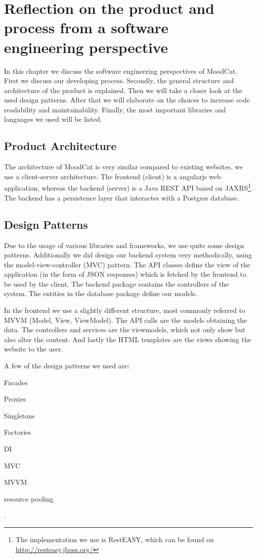 \chapter{Reflection on the product and process from a software engineering perspective}
In this chapter we discuss the software engineering perspectives of MoodCat.
First we discuss our developing process.
Secondly, the general structure and architecture of the product is explained.
Then we will take a closer look at the used design patterns.
After that we will elaborate on the choices to increase code readability and maintainability.
Finally, the most important libraries and languages we used will be listed.

\label{sec:product-architecture}
\section{Product Architecture}
The architecture of MoodCat is very similar compared to existing websites, we use a client-server architecture.
The frontend (client) is a \gls{angularjs} web application, whereas the backend (server) is a Java \gls{REST} API based on \gls{JAXRS}\footnote{The implementation we use is RestEASY, which can be found on \url{http://resteasy.jboss.org/}}. 
The backend has a persistence layer that interactes with a \gls{Postgres} database.

\section{Design Patterns}
Due to the usage of various libraries and frameworks, we use quite some design patterns.
Additionally we did design our backend system very methodically, using the model-view-controller (\gls{MVC}) pattern.
The API classes define the view of the application (in the form of \gls{JSON} responses) which is fetched by the frontend to be used by the client.
The backend package contains the controllers of the system.
The entities in the database package define our models.

In the frontend we use a slightly different structure, most commonly referred to \gls{MVVM} (Model, View, ViewModel).
The API calls are the models obtaining the data.
The controllers and services are the viewmodels, which not only show but also alter the content.
And lastly the \gls{HTML} templates are the views showing the website to the user.

A few of the design patterns we used are:
\begin{commalist}
\item Facades
\item Proxies
\item Singletons
\item Factories
\item \gls{DI}
\item \gls{MVC}
\item \gls{MVVM}
\item resource pooling
\end{commalist}.

